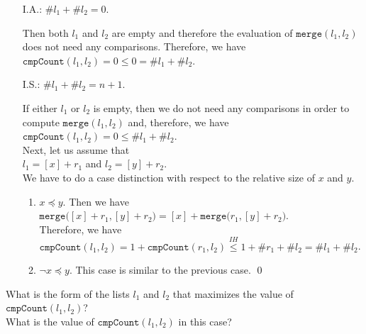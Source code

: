 \begin{enumerate}
\item[I.A.:] $\#l_1 + \#l_2=0$.

             Then both $l_1$ and $l_2$ are empty and therefore the evaluation of
             $\mathtt{merge}(l_1, l_2)$ does not need any comparisons.  Therefore, we have 
             \\[0.2cm]
             \hspace*{1.3cm}
             $\mathtt{cmpCount}(l_1, l_2) = 0 \leq 0 = \#l_1 + \#l_2$.
\item[I.S.:] $\#l_1 + \#l_2 = n+1$.

             If either $l_1$ or $l_2$ is empty, then we do not need any comparisons in order to
             compute $\mathtt{merge}(l_1, l_2)$ and, therefore, we have
             \\[0.2cm]
             \hspace*{1.3cm}
             $\mathtt{cmpCount}(l_1,l_2) = 0 \leq \#l_1 + \#l_2$.
             \\[0.2cm]
             Next, let us assume that \\[0.2cm]
             \hspace*{1.3cm} $l_1 = [x] + r_1$ \quad and \quad $l_2 = [y] + r_2$.
             \\[0.2cm]
             We have to do a case distinction with respect to the relative size of $x$ and $y$.
             \begin{enumerate}
             \item $x \preceq y$.  Then we have \\[0.2cm]
                   \hspace*{1.3cm} 
                   $\mathtt{merge}\bigl([x] + r_1, [y] + r_2\bigr) = [x] + \mathtt{merge}\bigl(r_1, [y] + r_2\bigr)$. 
                   \\[0.2cm]
                   Therefore, we have \\
                   $\mathtt{cmpCount}(l_1, l_2) = 1 + \mathtt{cmpCount}(r_1, l_2) \stackrel{IH}{\leq} 1 + \#r_1 + \#l_2 = \#l_1 + \#l_2$.
             \item $\neg x \preceq y$.  This case is similar to the previous case. 
                   \qed
             \end{enumerate}
\end{enumerate}
\exercise
What is the form of the lists $l_1$ and $l_2$ that maximizes the value of 
\\[0.2cm]
\hspace*{1.3cm}
$\mathtt{cmpCount}(l_1, l_2)$?
\\[0.2cm]
What is the value of $\mathtt{cmpCount}(l_1, l_2)$ in this case? \eox
\vspace*{0.3cm}


